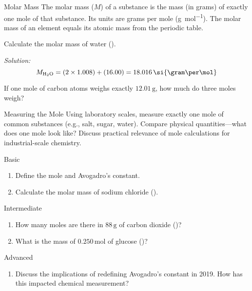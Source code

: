 \begin{keyconcept}{Molar Mass}
The molar mass (\(M\)) of a substance is the mass (in grams) of exactly one mole of that substance. Its units are grams per mole (\si{\gram\per\mol}). The molar mass of an element equals its atomic mass from the periodic table.
\end{keyconcept}

\begin{example}
Calculate the molar mass of water ().

\textit{Solution:}
\[
M_{\ce{H2O}} = (2 \times 1.008) + (16.00) = 18.016\,\si{\gram\per\mol}
\]
\end{example}

\begin{stopandthink}
If one mole of carbon atoms weighs exactly \(12.01\,\si{\gram}\), how much do three moles weigh?
\end{stopandthink}

\begin{investigation}{Measuring the Mole}
Using laboratory scales, measure exactly one mole of common substances (e.g., salt, sugar, water). Compare physical quantities—what does one mole look like? Discuss practical relevance of mole calculations for industrial-scale chemistry.
\end{investigation}

\begin{tieredquestions}{Basic}
\begin{enumerate}
  \item Define the mole and Avogadro’s constant.
  \item Calculate the molar mass of sodium chloride ().
\end{enumerate}
\end{tieredquestions}

\begin{tieredquestions}{Intermediate}
\begin{enumerate}
  \item How many moles are there in \(88\,\si{\gram}\) of carbon dioxide ()?
  \item What is the mass of \(0.250\,\si{\mol}\) of glucose ()?
\end{enumerate}
\end{tieredquestions}

\begin{tieredquestions}{Advanced}
\begin{enumerate}
  \item Discuss the implications of redefining Avogadro’s constant in 2019. How has this impacted chemical measurement?
\end{enumerate}
\end{tieredquestions}

